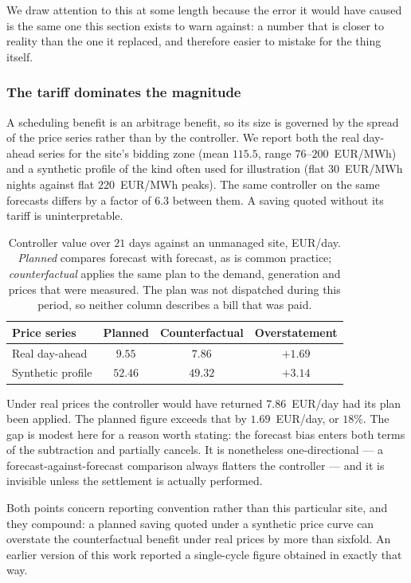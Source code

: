 \documentclass[journal]{IEEEtran}
\begin{document}
We draw attention to this at some length because the error it would have caused
is the same one this section exists to warn against: a number that is closer to
reality than the one it replaced, and therefore easier to mistake for the thing
itself.

\subsubsection{The tariff dominates the magnitude}
A scheduling benefit is an arbitrage benefit, so its size is governed by
the spread of the price series rather than by the controller. We report
both the real day-ahead series for the site's bidding zone (mean $115.5$,
range $76$--$200$~EUR/MWh) and a synthetic profile of the kind often used
for illustration (flat $30$~EUR/MWh nights against flat $220$~EUR/MWh
peaks). The same controller on the same forecasts differs by a factor of
$6.3$ between them. A saving quoted without its tariff is uninterpretable.

\begin{table}[t]
\centering
\caption{Controller value over $21$ days against an unmanaged site, EUR/day.
\emph{Planned} compares forecast with forecast, as is common practice;
\emph{counterfactual} applies the same plan to the demand, generation and
prices that were measured. The plan was not dispatched during this period, so
neither column describes a bill that was paid.}
\label{tab:mpc_impact}
\begin{tabular}{@{}lccc@{}}
\toprule
\textbf{Price series} & \textbf{Planned} & \textbf{Counterfactual} &
\textbf{Overstatement} \\
\midrule
Real day-ahead & $9.55$ & $\mathbf{7.86}$ & $+1.69$ \\
Synthetic profile & $52.46$ & $49.32$ & $+3.14$ \\
\bottomrule
\end{tabular}
\end{table}

Under real prices the controller would have returned $7.86$~EUR/day had its
plan been applied. The planned figure exceeds that by $1.69$~EUR/day, or
$18\%$. The gap is modest here for a reason worth stating: the forecast bias
enters both terms of the subtraction and partially cancels. It is nonetheless
one-directional --- a forecast-against-forecast comparison always flatters the
controller --- and it is invisible unless the settlement is actually performed.

Both points concern reporting convention rather than this particular site, and
they compound: a planned saving quoted under a synthetic price curve can
overstate the counterfactual benefit under real prices by more than sixfold. An
earlier version of this work reported a single-cycle figure obtained in exactly
that way.
\end{document}
